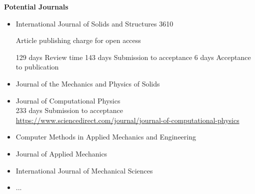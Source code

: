 \documentclass[10pt]{article}
\begin{document}


\textbf{Potential Journals}
\begin{itemize}
\item International Journal of Solids and Structures
3610

Article publishing charge
for open access

129 days
Review time
143 days
Submission to acceptance
6 days
Acceptance to publication

\item Journal of the Mechanics and Physics of Solids
\item Journal of Computational Physics \\
233 days Submission to acceptance \\
\url{https://www.sciencedirect.com/journal/journal-of-computational-physics}
\item Computer Methods in Applied Mechanics and Engineering
\item Journal of Applied Mechanics
\item International Journal of Mechanical Sciences
\item ...
\end{itemize}

\listoftodos

% 




\printbibliography %
\end{document}
